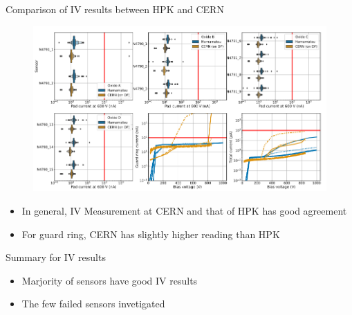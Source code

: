 \documentclass{beamer}
\begin{document}
\begin{frame}{Comparison of IV results between HPK and CERN}
  \begin{figure}
    \includegraphics[width=.7\textwidth]{plots/IV_CERN_HPK_300um_cropped.png}
  \end{figure}
  \begin{itemize}
    \scriptsize
      \item In general, IV Measurement at CERN and that of HPK has \alert{good agreement}
      \item For \alert{guard ring}, CERN has slightly higher reading than HPK 
  \end{itemize}
\end{frame}

\begin{frame}{Summary for IV results}
    \begin{table}[htbp] %
        \centering
        \footnotesize%
        \setlength\tabcolsep{2pt}%
        \caption{Summary for all protoA sensors}
        \end{table}   


    \begin{itemize}
        \item \alert{Marjority} of sensors have \alert{good IV} results
        \item The few failed sensors  invetigated
        
        
    \end{itemize}
\end{frame}
\end{document}
